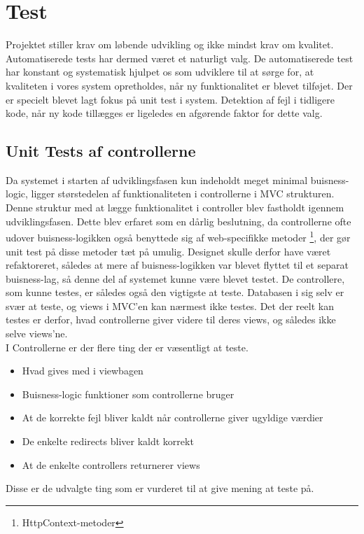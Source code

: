 \chapter{Test}

Projektet stiller krav om løbende udvikling og ikke mindst krav om kvalitet. 
Automatiserede tests har dermed været et naturligt valg. De automatiserede test har konstant og systematisk hjulpet os som udviklere til at sørge for, at kvaliteten i vores system opretholdes, når ny funktionalitet er blevet tilføjet. Der er specielt blevet lagt fokus på unit test i system. Detektion af fejl i tidligere kode, når ny kode tillægges er ligeledes en afgørende faktor for dette valg.



\section{Unit Tests af controllerne}
Da systemet i starten af udviklingsfasen kun indeholdt meget minimal buisness-logic, ligger størstedelen af funktionaliteten i controllerne i MVC strukturen. 
Denne struktur med at lægge funktionalitet i controller blev fastholdt igennem udviklingsfasen. Dette blev erfaret som en dårlig beslutning, da controllerne ofte udover buisness-logikken også benyttede sig af web-specifikke metoder \footnote{HttpContext-metoder}, der gør unit test på disse metoder tæt på umulig. Designet skulle derfor have været refaktoreret, således at mere af buisness-logikken var blevet flyttet til et separat buisness-lag, så denne del af systemet kunne være blevet testet.
De controllere, som kunne testes, er således også den vigtigste at teste. Databasen i sig selv er svær at teste, og views i MVC'en kan nærmest ikke testes. Det der reelt kan testes er derfor, hvad controllerne giver videre til deres views, og således ikke selve views'ne.\\ I Controllerne er der flere ting der er væsentligt at teste.
\begin{itemize}
	\item Hvad gives med i viewbagen
	\item Buisness-logic funktioner som controllerne bruger
	\item At de korrekte fejl bliver kaldt når controllerne giver ugyldige værdier
	\item De enkelte redirects bliver kaldt korrekt
	\item At de enkelte controllers returnerer views
\end{itemize}       
Disse er de udvalgte ting som er vurderet til at give mening at teste på.

